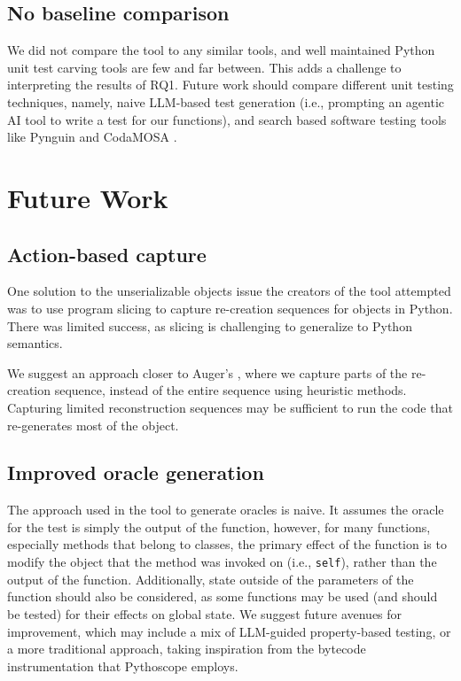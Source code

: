 \subsection{No baseline comparison}
We did not compare the tool to any similar tools, and well maintained Python unit test carving tools are few and far between.
This adds a challenge to interpreting the results of RQ1. Future work should compare different unit testing techniques,
namely, naive LLM-based test generation (i.e., prompting an agentic AI tool to write a test for our functions), and search based software
testing tools like Pynguin and CodaMOSA \cite{lemieux2023codamosa}.

\section{Future Work}

\subsection{Action-based capture}
One solution to the unserializable objects issue the creators of the tool attempted was to use
program slicing \cite{weiser1984program} to capture re-creation sequences for objects in Python. There was
limited success, as slicing is challenging to generalize to Python semantics.

We suggest an approach closer to Auger's \cite{augerblogspot}, where we capture parts of the
re-creation sequence, instead of the entire sequence using heuristic methods. Capturing limited reconstruction
sequences may be sufficient to run the code that re-generates most of the object.


\subsection{Improved oracle generation}
The approach used in the tool to generate oracles is naive. It assumes the oracle for the test is simply the output of the function, however, for many functions, especially methods
that belong to classes, the primary effect of the function is to modify the object that the method was invoked on (i.e., \verb|self|), rather than the output of the function. Additionally, state outside
of the parameters of the function should also be considered, as some functions may be used (and should be tested) for their effects on global state. We suggest future avenues for improvement, which may
include a mix of LLM-guided property-based testing, or a more traditional approach, taking inspiration from the bytecode instrumentation that Pythoscope employs.

